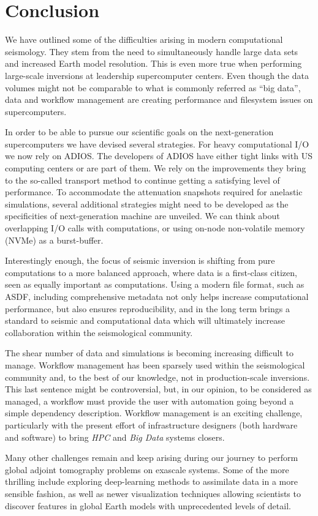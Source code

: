 \section{Conclusion}


We have outlined some of the difficulties arising in modern computational
seismology. They stem from the need to simultaneously handle large data sets and
increased Earth model resolution. This is even more true when performing large-scale
inversions at leadership supercomputer centers. Even though the data
volumes might not be comparable to what is commonly referred as ``big data'',
data and workflow management are creating performance and filesystem issues on
supercomputers.

In order to be able to pursue our scientific goals on the next-generation
supercomputers we have devised several strategies.
For heavy computational I/O we now rely on ADIOS. The developers of ADIOS have
either tight links with US computing centers or are part of them. We rely on the
improvements they bring to the so-called transport method
to continue getting a satisfying level of performance.
To accommodate the attenuation snapshots required for anelastic simulations,
several additional strategies might need to be
developed as the specificities of next-generation machine are unveiled. We can think
about overlapping I/O calls with computations, or using on-node non-volatile
memory (NVMe) as a burst-buffer.

Interestingly enough, the focus of seismic inversion is shifting from pure
computations to a more balanced approach, where data is a first-class citizen, seen
as equally important as computations. Using a modern file format, such as ASDF,
including comprehensive metadata not only helps increase computational
performance, but also ensures reproducibility, and in the long term brings a
standard to seismic and computational data which will ultimately increase
collaboration within the seismological community.

The shear number of data and simulations is becoming increasing difficult to
manage. Workflow management has been sparsely used within the
seismological community and, to the best of our knowledge, not in production-scale
inversions. This last sentence might be controversial, but, in our
opinion, to be considered as managed, a workflow must provide the user with
automation going beyond a simple dependency description.
Workflow management is an exciting challenge, particularly with the present
effort of infrastructure designers (both hardware and software) to bring
\emph{HPC} and \emph{Big Data} systems closers.

Many other challenges remain and keep arising during our journey to perform
global adjoint tomography problems on exascale systems. Some of the more
thrilling include exploring deep-learning methods to assimilate data in a more
sensible fashion, as well as newer visualization techniques allowing scientists
to discover features in global Earth models with unprecedented levels of detail.
